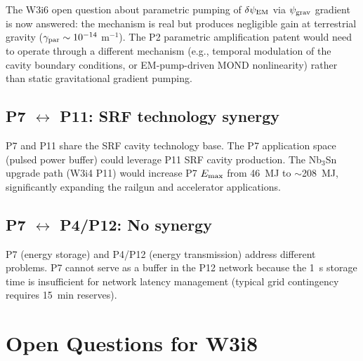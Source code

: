 \documentclass[11pt]{article}
\newcommand{\psigrav}{\psi_{\rm grav}}
\newcommand{\dpsiEM}{\delta\psi_{\rm EM}}
\begin{document}
The W3i6 open question about parametric pumping of $\dpsiEM$ via
$\psigrav$ gradient is now answered: the mechanism is real but produces
negligible gain at terrestrial gravity ($\gamma_{\rm par} \sim 10^{-14}$
m$^{-1}$). The P2 parametric amplification patent would need to operate
through a different mechanism (e.g., temporal modulation of the cavity
boundary conditions, or EM-pump-driven MOND nonlinearity) rather than
static gravitational gradient pumping.

\subsection{P7 $\leftrightarrow$ P11: SRF technology synergy}

P7 and P11 share the SRF cavity technology base. The P7 application
space (pulsed power buffer) could leverage P11 SRF cavity production.
The Nb$_3$Sn upgrade path (W3i4 P11) would increase P7 $E_{\rm max}$
from 46~MJ to $\sim$208~MJ, significantly expanding the railgun and
accelerator applications.

\subsection{P7 $\leftrightarrow$ P4/P12: No synergy}

P7 (energy storage) and P4/P12 (energy transmission) address different
problems. P7 cannot serve as a buffer in the P12 network because the
1~s storage time is insufficient for network latency management
(typical grid contingency requires 15~min reserves).

\section{Open Questions for W3i8}
\label{sec:open}
\end{document}
